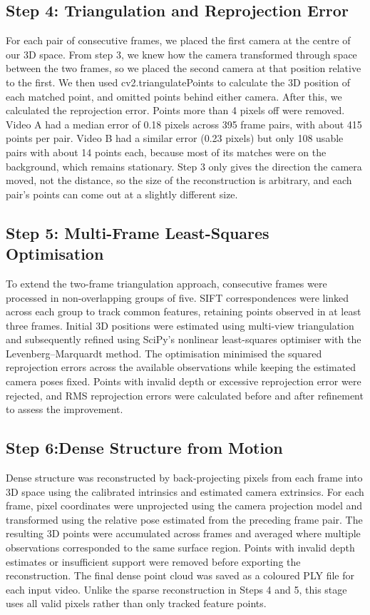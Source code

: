 \documentclass[conference]{assets/latex/IEEEtran}
\begin{document}
\subsection{Step 4: Triangulation and Reprojection Error}
For each pair of consecutive frames, we placed the first camera at the centre of our 3D space. From step 3, we knew how the camera transformed through space between the two frames, so we placed the second camera at that position relative to the first. We then used cv2.triangulatePoints to calculate the 3D position of each matched point, and omitted points behind either camera. After this, we calculated the reprojection error. Points more than 4 pixels off were removed. Video A had a median error of 0.18 pixels across 395 frame pairs, with about 415 points per pair. Video B had a similar error (0.23 pixels) but only 108 usable pairs with about 14 points each, because most of its matches were on the background, which remains stationary. Step 3 only gives the direction the camera moved, not the distance, so the size of the reconstruction is arbitrary, and each pair's points can come out at a slightly different size.

\subsection{Step 5: Multi-Frame Least-Squares Optimisation}
To extend the two-frame triangulation approach, consecutive frames were processed in non-overlapping groups of five. SIFT correspondences were linked across each group to track common features, retaining points observed in at least three frames. Initial 3D positions were estimated using multi-view triangulation and subsequently refined using SciPy's nonlinear least-squares optimiser with the Levenberg–Marquardt method. The optimisation minimised the squared reprojection errors across the available observations while keeping the estimated camera poses fixed. Points with invalid depth or excessive reprojection error were rejected, and RMS reprojection errors were calculated before and after refinement to assess the improvement.


\subsection{Step 6:Dense Structure from Motion}
Dense structure was reconstructed by back-projecting pixels from each frame into 3D space using the calibrated intrinsics and estimated camera extrinsics. For each frame, pixel coordinates were unprojected using the camera projection model and transformed using the relative pose estimated from the preceding frame pair.
The resulting 3D points were accumulated across frames and averaged where multiple observations corresponded to the same surface region. Points with invalid depth estimates or insufficient support were removed before exporting the reconstruction. The final dense point cloud was saved as a coloured PLY file for each input video.
Unlike the sparse reconstruction in Steps 4 and 5, this stage uses all valid pixels rather than only tracked feature points. 
\end{document}
